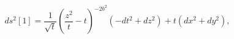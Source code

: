 \begin{equation}
  \label{eq:phi_1}
  ds^2 [1]=\frac{1}{{\sqrt t}}
  (\frac{z^2}{t}-t)^{-2 b^2}(-dt^2+dz^2)+t(dx^2+dy^2),
\end{equation}

